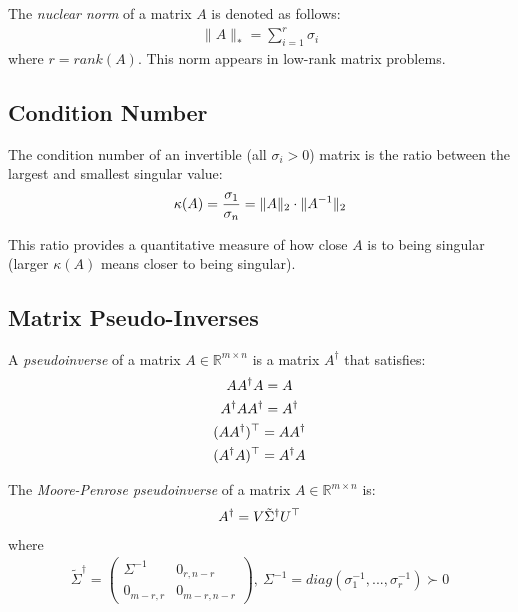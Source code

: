 \documentclass[12pt]{article}
\begin{document}
\begin{definition}
The \textit{nuclear norm} of a matrix $A$ is denoted as follows:
\begin{gather*}
    \|A\|_* = \sum_{i=1}^r \sigma_i
\end{gather*} where $r= rank(A)$. This norm appears in low-rank matrix problems.
\end{definition}

\subsection*{Condition Number}
\begin{definition}
The condition number of an invertible (all $\sigma_i > 0$) matrix is the ratio between the largest and smallest singular value:
\begin{gather*}
    \kappa(A) = \begin{frac}{\sigma_1}{\sigma_n} \end{frac}= \|A\|_2 \cdot \|A^{-1}\|_2
\end{gather*}
\end{definition}
This ratio provides a quantitative measure of how close $A$ is to being singular (larger $\kappa(A)$ means closer to being singular).
\subsection*{Matrix Pseudo-Inverses}
\begin{definition}
A \textit{pseudoinverse} of a matrix $A \in \mathbb{R}^{m \times n}$ is a matrix $A^\dagger$ that satisfies:
\begin{gather*}
    AA^\dagger A = A \\
    A^\dagger A A^\dagger = A^\dagger\\
    (AA^\dagger)^\top = AA^\dagger\\
    (A^\dagger A)^\top = A^\dagger A
\end{gather*}
\end{definition}
\begin{definition}
The \textit{Moore-Penrose pseudoinverse} of a matrix $A \in \mathbb{R}^{m \times n}$ is:
\begin{gather*}
    A^\dagger= V \tilde{\Sigma}^\dagger U^\top
\end{gather*}
where  
\begin{gather*}
    \tilde{\Sigma}^\dagger = \begin{pmatrix} \Sigma^{-1} & 0_{r, n-r} \\ 0_{m-r, r} & 0_{m-r, n-r}\end{pmatrix}, \ \Sigma^{-1} = diag(\sigma_1^{-1}, ..., \sigma_r^{-1})\succ 0
\end{gather*}
\end{definition}
\end{document}
